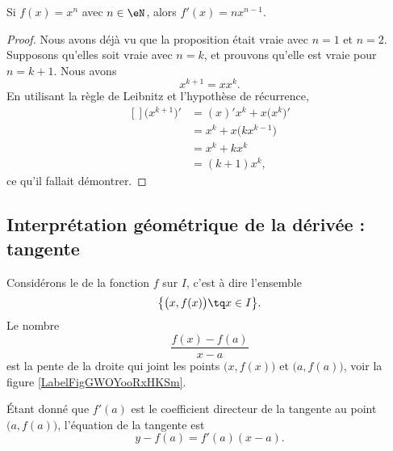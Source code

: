 \begin{proposition}
	Si $f(x)=x^n$ avec $n\in\eN$, alors $f'(x)=nx^{n-1}$.
\end{proposition}
\begin{proof}
	Nous avons déjà vu que la proposition était vraie avec $n=1$ et $n=2$. Supposons qu'elles soit vraie avec $n=k$, et prouvons qu'elle est vraie pour $n=k+1$. Nous avons
	\begin{equation}
		x^{k+1}=xx^k.
	\end{equation}
	En utilisant la règle de Leibnitz et l'hypothèse de récurrence,
	\begin{equation}
		\begin{aligned}[]
			\big( x^{k+1} \big)'&=(x)'x^k+x\big( x^k \big)'\\
			&=x^k+x\big( kx^{k-1} \big)\\
			&=x^k+kx^k\\
			&=(k+1)x^k,
		\end{aligned}
	\end{equation}
	ce qu'il fallait démontrer.
\end{proof}

\subsection[Interprétation géométrique : tangente]{Interprétation géométrique de la dérivée : tangente}

Considérons le  de la fonction $f$ sur $I$, c'est à dire l'ensemble
\begin{equation}
	\big\{ \big( x,f(x) \big)\tq x\in I \big\}.
\end{equation}
Le nombre 
\begin{equation}
	\frac{ f(x)-f(a) }{ x-a }
\end{equation}
est la pente de la droite qui joint les points $\big( x,f(x) \big)$ et $\big( a,f(a) \big)$, voir la figure  \ref{LabelFigGWOYooRxHKSm}. %
\newcommand{\CaptionFigGWOYooRxHKSm}{Le coefficient directeur de la corde entre $a$ et $x$.}


Étant donné que $f'(a)$ est le coefficient directeur de la tangente au point $\big( a,f(a) \big)$, l'équation de la tangente est
\begin{equation}		\label{EqTgfaen}
	y-f(a)=f'(a)(x-a).
\end{equation}

